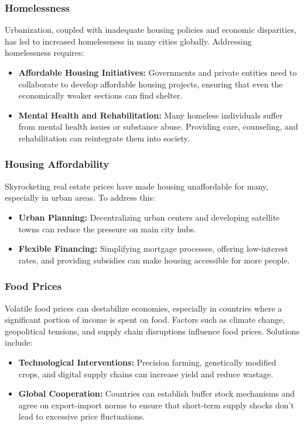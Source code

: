 \subsubsection*{Homelessness}
Urbanization, coupled with inadequate housing policies and economic disparities, has led to increased homelessness in many cities globally. Addressing homelessness requires:
\begin{itemize}
    \item \textbf{Affordable Housing Initiatives:} Governments and private entities need to collaborate to develop affordable housing projects, ensuring that even the economically weaker sections can find shelter.
    \item \textbf{Mental Health and Rehabilitation:} Many homeless individuals suffer from mental health issues or substance abuse. Providing care, counseling, and rehabilitation can reintegrate them into society.
\end{itemize}

\subsubsection*{Housing Affordability}
Skyrocketing real estate prices have made housing unaffordable for many, especially in urban areas. To address this:
\begin{itemize}
    \item \textbf{Urban Planning:} Decentralizing urban centers and developing satellite towns can reduce the pressure on main city hubs.
    \item \textbf{Flexible Financing:} Simplifying mortgage processes, offering low-interest rates, and providing subsidies can make housing accessible for more people.
\end{itemize}

\subsubsection*{Food Prices}
Volatile food prices can destabilize economies, especially in countries where a significant portion of income is spent on food. Factors such as climate change, geopolitical tensions, and supply chain disruptions influence food prices. Solutions include:
\begin{itemize}
    \item \textbf{Technological Interventions:} Precision farming, genetically modified crops, and digital supply chains can increase yield and reduce wastage.
    \item \textbf{Global Cooperation:} Countries can establish buffer stock mechanisms and agree on export-import norms to ensure that short-term supply shocks don't lead to excessive price fluctuations.
\end{itemize}

